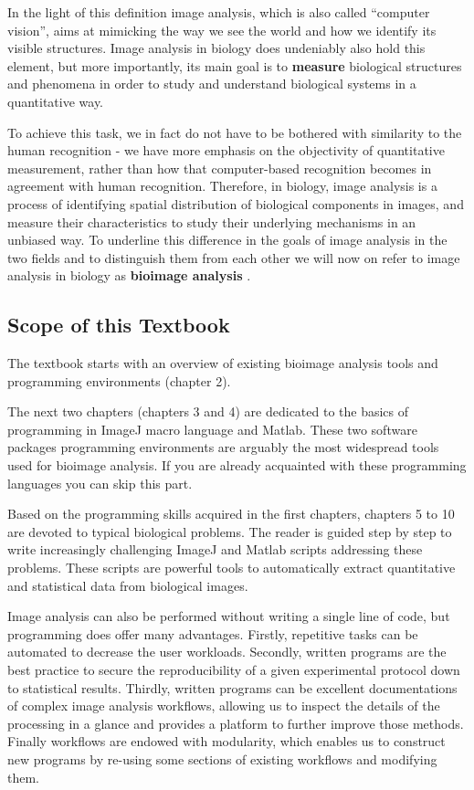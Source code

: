 In the light of this definition image analysis, which is also called ``computer vision'',
aims at mimicking the way we see the world and how we identify its visible structures. Image
analysis in biology does undeniably also hold this element, but more importantly, its main goal is to \textbf{measure} biological structures and phenomena in order to study and understand biological systems in a quantitative way.

To achieve this task, we in fact do not have to be bothered with
similarity to the human recognition - we have more emphasis on the
objectivity of quantitative measurement, rather than how that
computer-based recognition becomes in agreement with human recognition.
Therefore, in biology, image analysis is a process of identifying
spatial distribution of biological components in images, and measure
their characteristics to study
their underlying mechanisms in an unbiased way. To underline this difference in the goals of image analysis in
the two fields and to distinguish them from each other we will now on refer to image analysis in biology as
\textbf{bioimage analysis} .

\subsection{Scope of this Textbook}\label{scope-of-this-textbook}

The textbook starts with an overview of existing bioimage analysis tools and programming environments (chapter 2).

The next two chapters (chapters 3 and 4) are dedicated to the basics of programming in ImageJ macro language and Matlab.  These two software packages programming environments are arguably the most widespread tools used for bioimage analysis. If you are already acquainted with these programming languages you can skip this part.

Based on the programming skills acquired in the first chapters, chapters 5 to 10 are devoted to typical biological problems. The reader is guided step by step to write increasingly challenging ImageJ and Matlab scripts addressing these problems. These scripts are powerful tools to automatically extract quantitative and statistical data from biological images.

Image analysis can also be performed without writing a single line of code, but programming
does offer many advantages. 
Firstly, repetitive tasks can be automated to decrease the user workloads. 
Secondly, written programs are the best practice to secure the reproducibility of a given experimental protocol down to statistical results. 
Thirdly, written programs can be excellent documentations of
complex image analysis workflows, allowing us to inspect the details of the processing in a glance and provides a platform to further improve those methods.
Finally workflows are endowed with modularity, which enables us to construct new programs by re-using some sections of existing workflows and modifying them.

